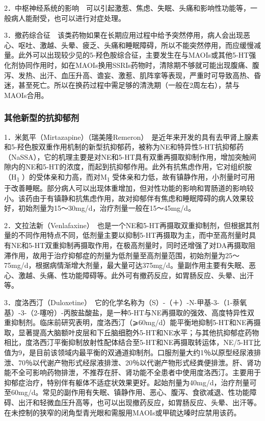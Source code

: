 2．中枢神经系统的影响　可以引起激惹、焦虑、失眠、头痛和影响性功能等，一般病人能耐受，也可以进行对症处理。

3．撤药综合征　该类药物如果在长期应用过程中给予突然停用，病人会出现恶心、呕吐、激越、头晕、疲乏、头痛和睡眠障碍，所以不能突然停用，而应缓慢减量。此外可以出现较少见的5-羟色胺综合征，主要发生在与MAOIs或其他5-HT强化剂协同作用时，如在MAOIs换用SSRIs药物时，清除期不够就可能出现腹痛、腹泻、发热、出汗、血压升高、谵妄、激惹、肌阵挛等表现，严重时可导致高热、昏迷，甚至死亡。所以在换药过程中需足够的清洗期（一般在2周左右），禁与MAOIs合用。

\subsubsection{其他新型的抗抑郁剂}

1．米氮平（Mirtazapine）（瑞美隆Remeron）　是近年来开发的具有去甲肾上腺素和5-羟色胺双重作用机制的新型抗抑郁药，被称为NE和特异性5-HT抗抑郁药（NaSSA），它的机理主要是对NE和5-HT具有双重再摄取抑制作用，增加突触间隙内的NE和5-HT的浓度，而起到抗抑郁作用。此外有抗焦虑作用，它对组织胺（H\textsubscript{1}
）的受体亲和力高，而对M\textsubscript{1}
受体亲和力低，故有镇静作用，小剂量时可用于改善睡眠。部分病人可以出现体重增加，但对性功能的影响和胃肠道的影响较小。该药由于有镇静和抗焦虑作用，故对抑郁伴有焦虑和睡眠障碍的病人效果较好，初始剂量为15～30mg/d，治疗剂量一般在15～45mg/d。

2．文拉法新（Venlafaxine）　也是一个NE和5-HT再摄取双重抑制剂，但根据其剂量的不同作用特点不同，低剂量主要以抑制5-HT再摄取为主，而中至高剂量时具有NE和5-HT双重抑制再摄取作用，在极高剂量时，同时还增强了对DA再摄取阻滞作用，故用于治疗抑郁症的剂量为低剂量至高剂量范围，初始剂量为25～75mg/d，根据病情渐增大剂量，最大量可达375mg/d。量副作用主要有失眠、恶心、激越、头痛、性功能障碍等。此外可有撤药反应，如胃肠反应、头晕、出汗等。

3．度洛西汀（Duloxetine）　它的化学名称为（S）-（＋）-N-甲基-3-（1-萘氧基）-3-（2-噻吩）-丙胺盐酸盐，是一种5-HT与NE再摄取的强效、高度特异性双重抑制剂。临床前研究表明，度洛西汀（⩾60mg/d）能平衡地抑制5-HT和NE再摄取，显著提高大脑额叶皮层和下丘脑细胞外5-HT和NE水平；与其他抗抑郁症药物相比，度洛西汀平衡抑制放射性配体结合至5-HT和NE再摄取转运体，NE/5-HT比值为9，是目前该领域内最平衡的双通道抑制剂。口服剂量大约1％以原型经尿液排泄、70％以代谢产物形式经尿液排泄、20％以代谢产物形式经粪便排泄。肝、肾功能不全可影响药物排泄，不推荐在肝、肾功能不全患者中使用度洛西汀。主要用于抑郁症治疗，特别伴有躯体不适症状效果更好。起始剂量为40mg/d，治疗剂量可至60mg/d。常见的副作用有失眠、镇静作用、恶心、腹泻、食欲减退、性功能障碍、出汗和轻微血压升高等，也可以出现撤药反应，如胃肠反应、头晕、出汗等。在未控制的狭窄的闭角型青光眼和需服用MAOIs或甲硫达嗪时应禁用该药。

